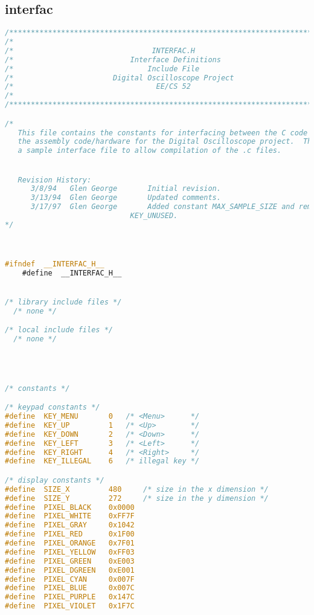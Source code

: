 \subsection{interfac}
\begin{lstlisting}[language=C]
/****************************************************************************/
/*                                                                          */
/*                                INTERFAC.H                                */
/*                           Interface Definitions                          */
/*                               Include File                               */
/*                       Digital Oscilloscope Project                       */
/*                                 EE/CS 52                                 */
/*                                                                          */
/****************************************************************************/

/*
   This file contains the constants for interfacing between the C code and
   the assembly code/hardware for the Digital Oscilloscope project.  This is
   a sample interface file to allow compilation of the .c files.


   Revision History:
      3/8/94   Glen George       Initial revision.
      3/13/94  Glen George       Updated comments.
      3/17/97  Glen George       Added constant MAX_SAMPLE_SIZE and removed
	                         KEY_UNUSED.
*/



#ifndef  __INTERFAC_H__
    #define  __INTERFAC_H__


/* library include files */
  /* none */

/* local include files */
  /* none */




/* constants */

/* keypad constants */
#define  KEY_MENU       0	/* <Menu>      */
#define  KEY_UP         1	/* <Up>        */
#define  KEY_DOWN       2	/* <Down>      */
#define  KEY_LEFT       3	/* <Left>      */
#define  KEY_RIGHT      4	/* <Right>     */
#define  KEY_ILLEGAL    6	/* illegal key */

/* display constants */
#define  SIZE_X         480		/* size in the x dimension */
#define  SIZE_Y			272     /* size in the y dimension */
#define  PIXEL_BLACK    0x0000
#define  PIXEL_WHITE    0xFF7F
#define  PIXEL_GRAY     0x1042
#define  PIXEL_RED		0x1F00
#define  PIXEL_ORANGE	0x7F01
#define  PIXEL_YELLOW	0xFF03
#define	 PIXEL_GREEN	0xE003
#define	 PIXEL_DGREEN	0xE001
#define	 PIXEL_CYAN		0x007F
#define  PIXEL_BLUE		0x007C
#define	 PIXEL_PURPLE	0x147C
#define	 PIXEL_VIOLET	0x1F7C


\end{lstlisting}

